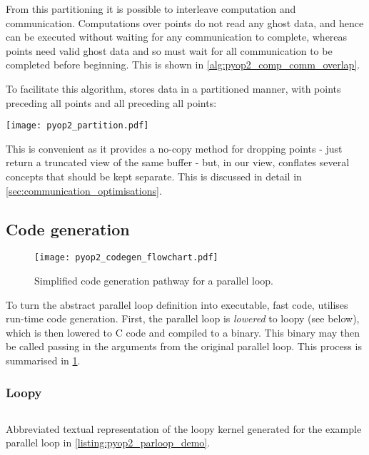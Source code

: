 \documentclass[thesis]{subfiles}
\begin{document}
From this partitioning it is possible to interleave computation and communication.
Computations over \coreiter points do not read any ghost data, and hence can be executed without waiting for any communication to complete, whereas \ownediter points need valid ghost data and so must wait for all communication to be completed before beginning.
This is shown in \cref{alg:pyop2_comp_comm_overlap}.

To facilitate this algorithm,  stores data in a partitioned manner, with \coreiter points preceding all \ownediter points and all \ownediter preceding all \ghostiter points:

\begin{center}
  \texttt{[image: pyop2\_partition.pdf]}
\end{center}

This is convenient as it provides a no-copy method for dropping \ghostiter points - just return a truncated view of the same buffer - but, in our view, conflates several concepts that should be kept separate.
This is discussed in detail in \cref{sec:communication_optimisations}.

\subsection{Code generation}
\label{sec:pyop2_codegen}

\begin{figure}
  \texttt{[image: pyop2\_codegen\_flowchart.pdf]}
  \caption{Simplified code generation pathway for a  parallel loop.}
  \label{fig:pyop2_codegen}
\end{figure}

To turn the abstract parallel loop definition into executable, fast code,  utilises run-time code generation.
First, the parallel loop is \emph{lowered} to loopy (see below), which is then lowered to C code and compiled to a binary.
This binary may then be called passing in the arguments from the original parallel loop.
This process is summarised in \cref{fig:pyop2_codegen}.

\subsubsection{Loopy}

\begin{listing}
  \centering
  \begin{minipage}{.9\textwidth}
    \inputminted{text}{./scripts/artefacts/pyop2_example_loopy_kernel_tidy.txt}
  \end{minipage}
  \caption{
    Abbreviated textual representation of the loopy kernel generated for the example parallel loop in \cref{listing:pyop2_parloop_demo}.
  }
  \label{listing:pyop2_example_loopy_kernel}
\end{listing}
\end{document}
